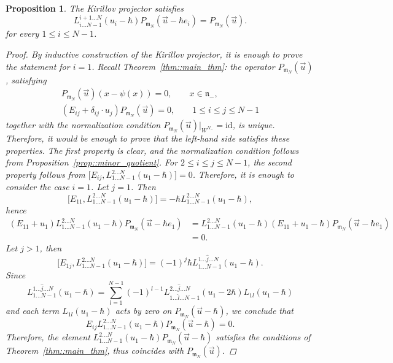 \documentclass[10pt,a4paper]{article}
\numberwithin{equation}{section}
\newtheorem{Proposition}[Theorem]{Proposition}
{ \theoremstyle{definition}
	\newtheorem{Definition}[Theorem]{Definition}
	\newtheorem{Note}[Theorem]{Note}
	\newtheorem{Example}[Theorem]{Example}
	\newtheorem{Remark}[Theorem]{Remark} }
\newcommand{\n}{\mathfrak{n}}
\newcommand{\m}{\mathfrak{m}}
\newcommand{\id}{\mathrm{id}}
\begin{document}
	\begin{Proposition}
		\label{prop:proj_var_shift}
		The Kirillov projector satisfies
		\[
		L_{i\dots N-1}^{i+1 \dots N}(u_i - \hbar) P_{\m_N}(\vec{u} - \hbar e_i) = P_{\m_N}(\vec{u}).
		\]
		for every $1 \leq i \leq N-1$.
		\begin{proof}
			By inductive construction of the Kirillov projector, it is enough to prove the statement for $i=1$. Recall Theorem~\ref{thm::main_thm}: the operator $P_{\m_N}(\vec{u})$, satisfying
			\begin{gather*}
				P_{\m_N} (\vec{u})(x-\psi(x)) = 0,\qquad x\in \n_-, \\
				(E_{ij} + \delta_{ij}\cdot u_j) P_{\m_N} (\vec{u}) =0,\qquad 1\leq i \leq j \leq N-1
			\end{gather*}
			together with the normalization condition $P_{\m_N} (\vec{u}) \big|_{W^{N_-}} = \id$, is unique. Therefore, it would be enough to prove that the left-hand side satisfies these properties. The first property is clear, and the normalization condition follows from Proposition~\ref{prop::minor_quotient}. For $2 \leq i \leq j \leq N-1$, the second property follows from
$
			\bigl[E_{ij}, L_{1\dots N-1}^{2\dots N} (u_1-\hbar)\bigr] = 0$.
			Therefore, it is enough to consider the case $i=1$. Let $j=1$. Then
			\[
			\bigl[E_{11}, L_{1\dots N-1}^{2\dots N} (u_1-\hbar)\bigr] = -\hbar L_{1\dots N-1}^{2\dots N} (u_1-\hbar),
			\]
			hence
			\begin{align*}
				(E_{11} + u_1) L_{1\dots N-1}^{2\dots N} (u_1-\hbar) P_{\m_N}(\vec{u}-\hbar e_1)
				&=L_{1\dots N-1}^{2\dots N} (u_1-\hbar) (E_{11}+u_1-\hbar) P_{\m_N}(\vec{u}-\hbar e_1)\\& = 0.
			\end{align*}
			Let $j>1$, then
			\[
			\bigl[E_{1j}, L_{1\dots N-1}^{2\dots N}(u_1-\hbar)\bigr] = (-1)^{j} \hbar L_{1\dots N-1}^{1 \dots \hat{j} \dots N}(u_1-\hbar).
			\]
			Since
			\[
			L_{1\dots N-1}^{1 \dots \hat{j} \dots N}(u_1-\hbar) = \sum\limits_{l=1}^{N-1} (-1)^{l-1} L_{1\dots \hat{l} \dots N-1}^{2\dots \hat{j} \dots N}(u_1-2\hbar) L_{1l}(u_1-\hbar)
			\]
			and each term $L_{1l}(u_1-\hbar)$ acts by zero on $P_{\m_N}(\vec{u}-\hbar)$, we conclude that
			\[
			E_{ij}L_{1\dots N-1}^{2\dots N}(u_1-\hbar) P_{\m_N}(\vec{u}-\hbar) = 0.
			\]
			Therefore, the element
$
			L_{1\dots N-1}^{2\dots N}(u_1-\hbar) P_{\m_N}(\vec{u}-\hbar)
$
			satisfies the conditions of Theorem~\ref{thm::main_thm}, thus coincides with $P_{\m_N} (\vec{u})$.
		\end{proof}
	\end{Proposition}
	
\end{document}
